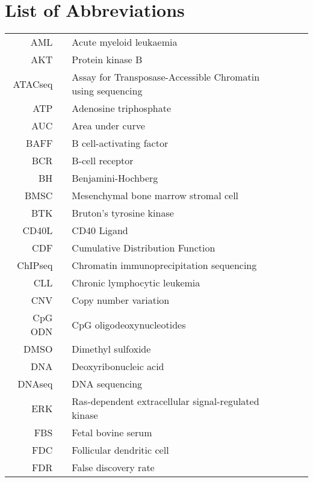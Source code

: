 \documentclass[11pt, a4paper, twosided]{book}
\begin{document}
\newpage
\tableofcontents
\clearpage

\newpage
\hypertarget{list-of-abbreviations}{%
\chapter*{List of Abbreviations}\label{list-of-abbreviations}}
\begin{tabular}{rp{0.2cm}lp{1cm}rp{0.2cm}l}
    AML & & Acute myeloid leukaemia \\
    AKT & & Protein kinase B \\
    ATACseq & & Assay for Transposase-Accessible Chromatin using sequencing \\
    ATP & & Adenosine triphosphate \\
    AUC & & Area under curve \\
    BAFF & & B cell-activating factor \\
    BCR & & B-cell receptor \\
    BH & & Benjamini-Hochberg \\
    BMSC & & Mesenchymal bone marrow stromal cell \\
    BTK & & Bruton’s tyrosine kinase \\
    CD40L & & CD40 Ligand \\
    CDF & & Cumulative Distribution Function \\
    ChIPseq & & Chromatin immunoprecipitation sequencing \\
    CLL & & Chronic lymphocytic leukemia \\
    CNV & & Copy number variation \\
    CpG ODN & & CpG oligodeoxynucleotides \\
    DMSO & & Dimethyl sulfoxide  \\
    DNA & & Deoxyribonucleic acid  \\
    DNAseq & & DNA sequencing \\
    ERK & & Ras-dependent extracellular signal-regulated kinase \\
    FBS & & Fetal bovine serum \\
    FDC & & Follicular dendritic cell \\
    FDR & & False discovery rate \\

\end{tabular}
\end{document}
